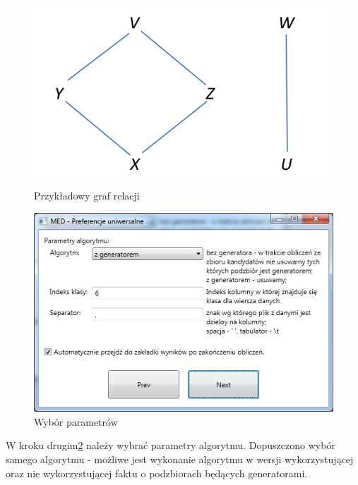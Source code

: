 \documentclass[a4paper,12pt]{article}
\begin{document}
\begin{figure}[h!]
\begin{center}
\includegraphics[width=\textwidth]{img/relations.png}
\caption{Przykładowy graf relacji}
\label{relat}
\end{center}
\end{figure}


\begin{figure}[h!]
\begin{center}
\includegraphics[width=\textwidth]{img/2.png}
\caption{Wybór parametrów}
\label{krok2}
\end{center}
\end{figure}

W kroku drugim\ref{krok2} należy wybrać parametry algorytmu. Dopuszczono wybór samego algorytmu - możliwe jest wykonanie algorytmu w wersji wykorzystującej oraz nie wykorzystującej faktu o podzbiorach będących generatorami.\\
\end{document}
